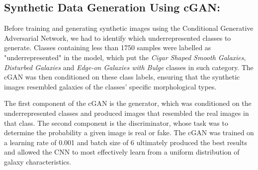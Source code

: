 \documentclass[10pt,twocolumn,letterpaper]{article}
\begin{document}
\subsection{Synthetic Data Generation Using cGAN:} 
Before training and generating synthetic images using the Conditional Generative Adversarial Network, we had to identify which underrepresented classes to generate.
Classes containing less than 1750 samples were labelled as "underrepresented" in the model, which put the \textit{Cigar Shaped Smooth Galaxies}, \textit{Disturbed Galaxies} and \textit{Edge-on Galaxies with Bulge} classes in such category.
The cGAN was then conditioned on these class labels, ensuring that the synthetic images resembled galaxies of the classes' specific morphological types. 

The first component of the cGAN is the generator, which was conditioned on the underrepresented classes and produced images that resembled the real images in that class.
The second component is the discriminator, whose task was to determine the probability a given image is real or fake.
The cGAN was trained on a learning rate of 0.001 and batch size of 6 ultimately produced the best results and allowed the CNN to most effectively learn from a uniform distribution of galaxy characteristics.
\end{document}
